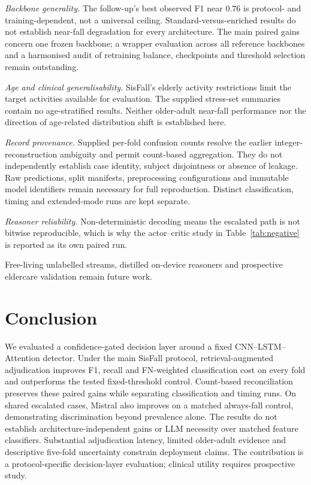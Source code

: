 \documentclass[journal]{IEEEtran}
\begin{document}
\emph{Backbone generality.} The follow-up's best observed F1 near $0.76$ is protocol- and training-dependent, not a universal ceiling. Standard-versus-enriched results do not establish near-fall degradation for every architecture. The main paired gains concern one frozen backbone; a wrapper evaluation across all reference backbones and a harmonised audit of retraining balance, checkpoints and threshold selection remain outstanding.

\emph{Age and clinical generalisability.} SisFall's elderly activity restrictions limit the target activities available for evaluation. The supplied stress-set summaries contain no age-stratified results. Neither older-adult near-fall performance nor the direction of age-related distribution shift is established here.

\emph{Record provenance.} Supplied per-fold confusion counts resolve the earlier integer-reconstruction ambiguity and permit count-based aggregation. They do not independently establish case identity, subject disjointness or absence of leakage. Raw predictions, split manifests, preprocessing configurations and immutable model identifiers remain necessary for full reproduction. Distinct classification, timing and extended-mode runs are kept separate.

\emph{Reasoner reliability.} Non-deterministic decoding means the escalated path is not bitwise reproducible, which is why the actor--critic study in Table~\ref{tab:negative} is reported as its own paired run.

Free-living unlabelled streams, distilled on-device reasoners and prospective eldercare validation remain future work.

\section{Conclusion}
\label{sec:concl}

We evaluated a confidence-gated decision layer around a fixed CNN--LSTM--Attention detector. Under the main SisFall protocol, retrieval-augmented adjudication improves F1, recall and FN-weighted classification cost on every fold and outperforms the tested fixed-threshold control. Count-based reconciliation preserves these paired gains while separating classification and timing runs. On shared escalated cases, Mistral also improves on a matched always-fall control, demonstrating discrimination beyond prevalence alone. The results do not establish architecture-independent gains or LLM necessity over matched feature classifiers. Substantial adjudication latency, limited older-adult evidence and descriptive five-fold uncertainty constrain deployment claims. The contribution is a protocol-specific decision-layer evaluation; clinical utility requires prospective study.
\end{document}
